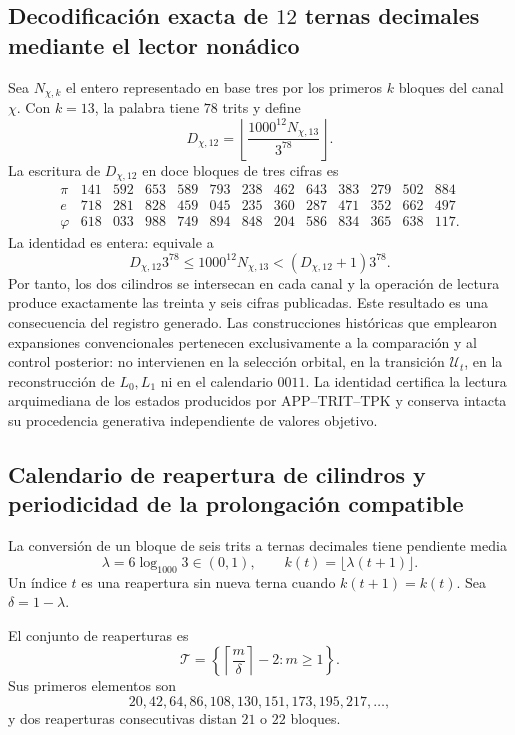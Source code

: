 \subsection{Decodificación exacta de \(12\) ternas decimales mediante el lector nonádico}

Sea \(N_{\chi,k}\) el entero representado en base tres por los primeros \(k\)
bloques del canal \(\chi\). Con \(k=13\), la palabra tiene \(78\) trits y
define
\[
D_{\chi,12}
=\left\lfloor\frac{1000^{12}N_{\chi,13}}{3^{78}}\right\rfloor.
\]
La escritura de \(D_{\chi,12}\) en doce bloques de tres cifras es
\[
\begin{array}{c|rrrrrrrrrrrr}
\pi&141&592&653&589&793&238&462&643&383&279&502&884\\
e&718&281&828&459&045&235&360&287&471&352&662&497\\
\varphi&618&033&988&749&894&848&204&586&834&365&638&117.
\end{array}
\]
La identidad es entera: equivale a
\[
D_{\chi,12}3^{78}
\le 1000^{12}N_{\chi,13}
<(D_{\chi,12}+1)3^{78}.
\]
Por tanto, los dos cilindros se intersecan en cada canal y la operación de
lectura produce exactamente las treinta y seis cifras publicadas. Este
resultado es una consecuencia del registro generado. Las construcciones
históricas que emplearon expansiones convencionales pertenecen exclusivamente
a la comparación y al control posterior: no intervienen en la selección
orbital, en la transición \(\mathcal U_t\), en la reconstrucción de
\(L_0,L_1\) ni en el calendario \(0011\). La identidad certifica la lectura
arquimediana de los estados producidos por APP--TRIT--TPK y conserva intacta
su procedencia generativa independiente de valores objetivo.

\subsection{Calendario de reapertura de cilindros y periodicidad de la prolongación compatible}

La conversión de un bloque de seis trits a ternas decimales tiene pendiente
media
\[
\lambda=6\log_{1000}3\in(0,1),
\qquad k(t)=\lfloor\lambda(t+1)\rfloor.
\]
Un índice \(t\) es una reapertura sin nueva terna cuando
\(k(t+1)=k(t)\). Sea \(\delta=1-\lambda\).

\begin{theorem}
\label{thm:calendario-beatty}
El conjunto de reaperturas es
\[
\mathcal T=
\left\{\left\lceil\frac{m}{\delta}\right\rceil-2:m\ge1\right\}.
\]
Sus primeros elementos son
\[
20,42,64,86,108,130,151,173,195,217,\ldots,
\]
y dos reaperturas consecutivas distan \(21\) o \(22\) bloques.
\end{theorem}

